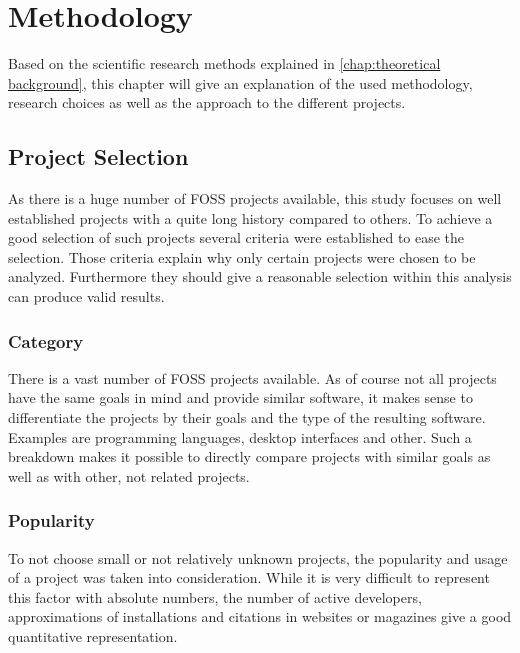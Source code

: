 \chapter{Methodology} %
\label{chap:methodology}

Based on the scientific research methods explained in \autoref{chap:theoretical
background}, this chapter will give an explanation of the used methodology,
research choices as well as the approach to the different projects.

\section{Project Selection} %

As there is a huge number of \ac{FOSS} projects available, this study focuses
on well established projects with a quite long history compared to others. To
achieve a good selection of such projects several criteria were established to
ease the selection. Those criteria explain why only certain projects were
chosen to be analyzed. Furthermore they should give a reasonable selection
within this analysis can produce valid results.

\subsection{Category} %

There is a vast number of \ac{FOSS} projects available. As of course not all
projects have the same goals in mind and provide similar software, it makes
sense to differentiate the projects by their goals and the type of the
resulting software. Examples are programming languages, desktop interfaces and
other. Such a breakdown makes it possible to directly compare projects with
similar goals as well as with other, not related projects.


\subsection{Popularity} %

To not choose small or not relatively unknown projects, the popularity and
usage of a project was taken into consideration. While it is very difficult to
represent this factor with absolute numbers, the number of active developers,
approximations of installations and citations in websites or magazines give a
good quantitative representation.



